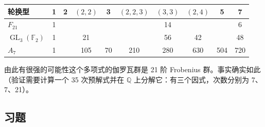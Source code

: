 \begin{center}
\begin{tabular}{lccccccccc}
\hline
轮换型 & 1 & 2 & \((2,2)\) & 3 & \((2,2,3)\) & \((3,3)\) & \((2,4)\) & 5 & 7\\
\hline
\(F_{21}\) & 1 & & & & & 14 & & & 6\\
\(\operatorname{GL}_3(\mathbb{F}_2)\) & 1 & & 21 & & & 56 & 42 & & 48\\
\(A_7\) & 1 & & 105 & 70 & 210 & 280 & 630 & 504 & 720\\
\hline
\end{tabular}
\end{center}

由此有很强的可能性这个多项式的伽罗瓦群是 21 阶 Frobenius 群。事实确实如此（验证需要计算一个 35 次预解式并在 \(\mathbb{Q}\) 上分解它：有三个因式，次数分别为 7、7、21）。

\subsection*{习题}

